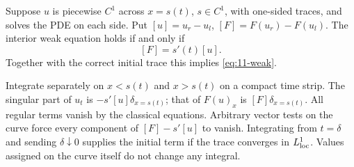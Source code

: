 \begin{theorem}
Suppose $u$ is piecewise $C^1$ across $x=s(t)$, $s\in C^1$, with
one-sided traces, and solves the PDE on each side. Put
$[u]=u_r-u_l$, $[F]=F(u_r)-F(u_l)$. The interior weak equation
holds if and only if
\begin{equation}\label{eq:11-rh}
 [F]=s'(t)[u].
\end{equation}
Together with the correct initial trace this implies \eqref{eq:11-weak}.
\end{theorem}
\begin{expandedproof}
Integrate separately on $x<s(t)$ and $x>s(t)$ on a compact time strip.
The singular part of $u_t$ is $-s'[u]\delta_{x=s(t)}$; that of
$F(u)_x$ is $[F]\delta_{x=s(t)}$. All regular terms vanish by the
classical equations. Arbitrary vector tests on the curve force every
component of $[F]-s'[u]$ to vanish. Integrating from $t=\delta$
and sending $\delta\downarrow0$ supplies the initial term if the
trace converges in $L^1_{\rm loc}$. Values assigned on the curve
itself do not change any integral.
\end{expandedproof}

